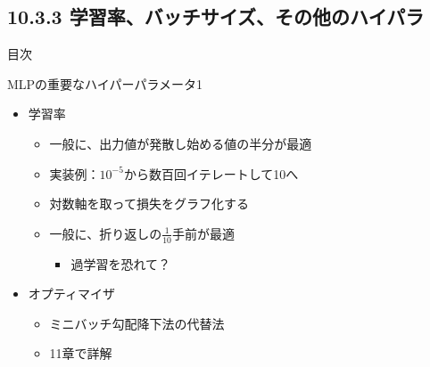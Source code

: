 \documentclass[aspectratio=169, dvipdfmx, 14pt, xcolor={svgnames,dvipsnames}]{beamer}
\def\tightlist{\itemsep1pt\parskip0pt\parsep0pt}
\begin{document}

\hypertarget{ux5b66ux7fd2ux7387ux30d0ux30c3ux30c1ux30b5ux30a4ux30baux305dux306eux4ed6ux306eux30cfux30a4ux30d1ux30e9}{%
  \subsection{10.3.3
    学習率、バッチサイズ、その他のハイパラ}\label{ux5b66ux7fd2ux7387ux30d0ux30c3ux30c1ux30b5ux30a4ux30baux305dux306eux4ed6ux306eux30cfux30a4ux30d1ux30e9}}
\begin{frame}{\quad 目次}
  \tableofcontents[currentsubsection]
\end{frame}


\begin{frame}{\quad MLPの重要なハイパーパラメータ1}
  \begin{itemize}
    \tightlist
    \item
          学習率

          \begin{itemize}
            \tightlist
            \item
                  一般に、\alert{出力値が発散し始める値の半分が最適}
            \item
                  実装例：$10^{-5}$から数百回イテレートして10へ
            \item
                  対数軸を取って損失をグラフ化する
            \item
                  一般に、\alert{折り返しの$\frac{1}{10}$手前が最適}

                  \begin{itemize}
                    \tightlist
                    \item
                          過学習を恐れて？
                  \end{itemize}
          \end{itemize}
    \item
          オプティマイザ

          \begin{itemize}
            \tightlist
            \item
                  ミニバッチ勾配降下法の代替法
            \item
                  11章で詳解
          \end{itemize}
  \end{itemize}
\end{frame}
\end{document}
